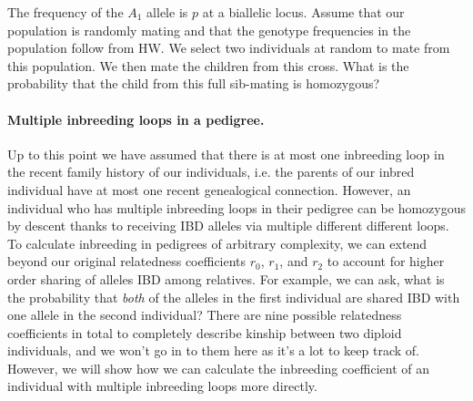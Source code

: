\begin{question}{}
The frequency of the $A_1$ allele is $p$ at a biallelic locus. Assume that our population is randomly mating and that the
genotype frequencies in the population follow from HW. We select two
individuals at random to mate from this population. We then mate the children
from this cross. What is the probability that the child from this full
sib-mating is
homozygous?
\end{question}

\paragraph{Multiple inbreeding loops in a pedigree.}
Up to this point we have assumed that there is at most one inbreeding loop in the recent family history of our
  individuals, i.e. the parents of our inbred individual have at most one recent genealogical connection. However, an individual who has multiple inbreeding loops in their pedigree can be homozygous by
  descent thanks to receiving IBD alleles via multiple different different loops. To calculate inbreeding in pedigrees of arbitrary complexity, we can extend
 beyond our original relatedness coefficients $r_0$, $r_1$, and $r_2$ to account for
 higher order sharing of alleles IBD among relatives. For example,
 we can ask, what is the probability that \textit{both} of the alleles in the first individual
 are shared IBD with one allele in the second individual? There are
 nine possible relatedness coefficients in total to completely describe kinship between two diploid individuals, and we won't go in to them here
 as it's a lot to keep track of.
However, we will show how we can calculate the inbreeding coefficient of an
individual with multiple inbreeding loops more directly.\\


